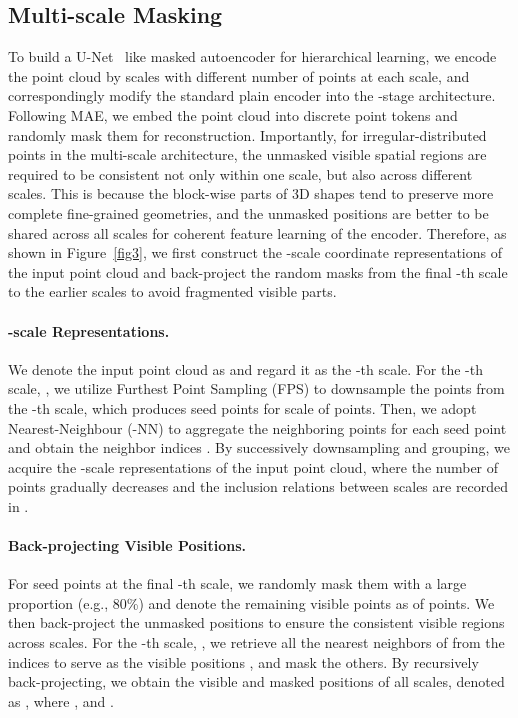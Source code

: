 \documentclass{article}
\begin{document}
\subsection{Multi-scale Masking}
\label{mmask}
To build a U-Net~\cite{unet} like masked autoencoder for hierarchical learning, we encode the point cloud by  scales with different number of points at each scale, and correspondingly modify the standard plain encoder into the -stage architecture. Following MAE, we embed the point cloud into discrete point tokens and randomly mask them for reconstruction. Importantly, for irregular-distributed points in the multi-scale architecture, the unmasked visible spatial regions are required to be consistent not only within one scale, but also across different scales. This is because the block-wise parts of 3D shapes tend to preserve more complete fine-grained geometries, and the unmasked positions are better to be shared across all scales for coherent feature learning of the encoder.
Therefore, as shown in Figure~\ref{fig3}, we first construct the -scale coordinate representations of the input point cloud and back-project the random masks from the final -th scale to the earlier scales to avoid fragmented visible parts.



\paragraph{-scale Representations.}
We denote the input point cloud as  and regard it as the -th scale. For the -th scale, , we utilize Furthest Point Sampling (FPS) to downsample the points from the -th scale, which produces seed points  for scale  of  points. Then, we adopt  Nearest-Neighbour (-NN) to aggregate the neighboring  points for each seed point and obtain the neighbor indices . By successively downsampling and grouping, we acquire the -scale representations  of the input point cloud, where the number of points  gradually decreases and the inclusion relations between scales are recorded in . 


\paragraph{Back-projecting Visible Positions.}
For seed points  at the final -th scale, we randomly mask them with a large proportion (e.g., 80\%) and denote the remaining visible points as  of  points. We then back-project the unmasked positions  to ensure the consistent visible regions across scales.
For the -th scale, , we retrieve all the  nearest neighbors of  from the indices  to serve as the visible positions , and mask the others. By recursively back-projecting, we obtain the visible and masked positions of all  scales, denoted as , where ,  and .
\end{document}

